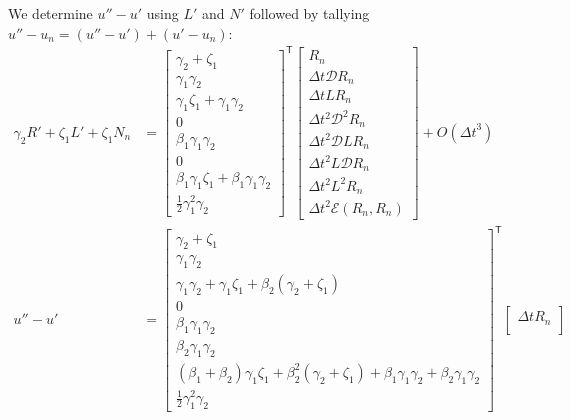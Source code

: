 \documentclass[letterpaper,11pt]{amsart}
\newcommand{\trans}[1]{{#1}^{\ensuremath{\mathsf{T}}}}
\newcommand{\order}[2]{\ensuremath{O\!\left( {#1}^{#2} \right)}}
\begin{document}
We determine $u''-u'$ using $L'$ and $N'$ followed by tallying
$u''-u_{n} = (u''-u')+(u'-u_{n})$:
\begin{align}
      \gamma_{2} R'
    + \zeta_{1}  L'
    + \zeta_{1}  N_{n}
  &=
\trans{\begin{bmatrix}
  \gamma_{2} + \zeta_{1} \\
  \gamma_{1} \gamma_{2} \\
  \gamma_{1} \zeta_{1} + \gamma_{1} \gamma_{2} \\
  0 \\
  \beta_{1} \gamma_{1} \gamma_{2} \\
  0 \\
  \beta_{1} \gamma_{1} \zeta_{1} + \beta_{1} \gamma_{1} \gamma_{2} \\
  \frac{1}{2} \gamma_{1}^{2} \gamma_{2}
\end{bmatrix}}
\begin{bmatrix}
  R_{n} \\
  \Delta{}t \mathcal{D} R_{n} \\
  \Delta{}t L R_{n} \\
  \Delta{}t^{2} \mathcal{D}^{2} R_{n} \\
  \Delta{}t^{2} \mathcal{D} L R_{n} \\
  \Delta{}t^{2} L \mathcal{D} R_{n} \\
  \Delta{}t^{2} L^{2} R_{n} \\
  \Delta{}t^{2} \mathcal{E}\left( R_{n}, R_{n} \right)
\end{bmatrix}
  + \order{\Delta{}t}{3}
\\
  u'' - u'
  &=
\trans{\begin{bmatrix}
  \gamma_{2} + \zeta_{1} \\
  \gamma_{1} \gamma_{2} \\
    \gamma_{1} \gamma_{2} + \gamma_{1} \zeta_{1}
  + \beta_{2}\left( \gamma_{2} + \zeta_{1} \right) \\
  0 \\
  \beta_{1} \gamma_{1} \gamma_{2} \\
  \beta_{2} \gamma_{1} \gamma_{2} \\
    \left( \beta_{1} + \beta_{2} \right) \gamma_{1} \zeta_{1}
  + \beta_{2}^{2} \left( \gamma_{2} + \zeta_{1} \right)
  + \beta_{1} \gamma_{1} \gamma_{2}
  + \beta_{2} \gamma_{1} \gamma_{2}
  \\
  \frac{1}{2} \gamma_{1}^{2} \gamma_{2}
\end{bmatrix}}
\begin{bmatrix}
  \Delta{}t R_{n} \\

\end{bmatrix}
\end{align}
\end{document}
